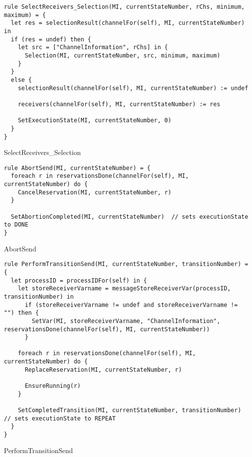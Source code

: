 \begin{listing}[H]
\begin{verbatim}
rule SelectReceivers_Selection(MI, currentStateNumber, rChs, minimum, maximum) = {
  let res = selectionResult(channelFor(self), MI, currentStateNumber) in
  if (res = undef) then {
    let src = ["ChannelInformation", rChs] in {
      Selection(MI, currentStateNumber, src, minimum, maximum)
    }
  }
  else {
    selectionResult(channelFor(self), MI, currentStateNumber) := undef

    receivers(channelFor(self), MI, currentStateNumber) := res

    SetExecutionState(MI, currentStateNumber, 0)
  }
}
\end{verbatim}
\caption{SelectReceivers_Selection}
\label{lst:asm:SelectReceivers_Selection}
\end{listing}




\begin{listing}[H]
\begin{verbatim}
rule AbortSend(MI, currentStateNumber) = {
  foreach r in reservationsDone(channelFor(self), MI, currentStateNumber) do {
    CancelReservation(MI, currentStateNumber, r)
  }

  SetAbortionCompleted(MI, currentStateNumber)  // sets executionState to DONE
}
\end{verbatim}
\caption{AbortSend}
\label{lst:asm:AbortSend}
\end{listing}




\begin{listing}[H]
\begin{verbatim}
rule PerformTransitionSend(MI, currentStateNumber, transitionNumber) = {
  let processID = processIDFor(self) in {
    let storeReceiverVarname = messageStoreReceiverVar(processID, transitionNumber) in
      if (storeReceiverVarname != undef and storeReceiverVarname != "") then {
        SetVar(MI, storeReceiverVarname, "ChannelInformation", reservationsDone(channelFor(self), MI, currentStateNumber))
      }

    foreach r in reservationsDone(channelFor(self), MI, currentStateNumber) do {
      ReplaceReservation(MI, currentStateNumber, r)

      EnsureRunning(r)
    }

    SetCompletedTransition(MI, currentStateNumber, transitionNumber) // sets executionState to REPEAT
  }
}
\end{verbatim}
\caption{PerformTransitionSend}
\label{lst:asm:PerformTransitionSend}
\end{listing}




